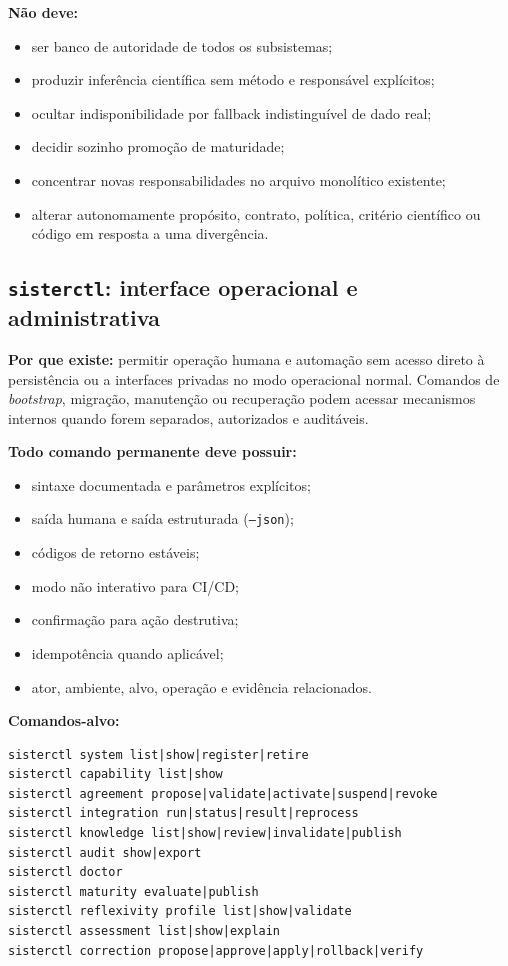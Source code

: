\documentclass[11pt,a4paper,oneside]{article}
\begin{document}
\textbf{Não deve:}
\begin{itemize}
  \item ser banco de autoridade de todos os subsistemas;
  \item produzir inferência científica sem método e responsável explícitos;
  \item ocultar indisponibilidade por fallback indistinguível de dado real;
  \item decidir sozinho promoção de maturidade;
  \item concentrar novas responsabilidades no arquivo monolítico existente;
  \item alterar autonomamente propósito, contrato, política, critério científico ou código em resposta a uma divergência.
\end{itemize}

\subsection{\texttt{sisterctl}: interface operacional e administrativa}
\textbf{Por que existe:} permitir operação humana e automação sem acesso direto à persistência ou a interfaces privadas no modo operacional normal. Comandos de \textit{bootstrap}, migração, manutenção ou recuperação podem acessar mecanismos internos quando forem separados, autorizados e auditáveis.

\textbf{Todo comando permanente deve possuir:}
\begin{itemize}
  \item sintaxe documentada e parâmetros explícitos;
  \item saída humana e saída estruturada (\texttt{--json});
  \item códigos de retorno estáveis;
  \item modo não interativo para CI/CD;
  \item confirmação para ação destrutiva;
  \item idempotência quando aplicável;
  \item ator, ambiente, alvo, operação e evidência relacionados.
\end{itemize}

\textbf{Comandos-alvo:}
\begin{lstlisting}
sisterctl system list|show|register|retire
sisterctl capability list|show
sisterctl agreement propose|validate|activate|suspend|revoke
sisterctl integration run|status|result|reprocess
sisterctl knowledge list|show|review|invalidate|publish
sisterctl audit show|export
sisterctl doctor
sisterctl maturity evaluate|publish
sisterctl reflexivity profile list|show|validate
sisterctl assessment list|show|explain
sisterctl correction propose|approve|apply|rollback|verify
\end{lstlisting}
\end{document}
